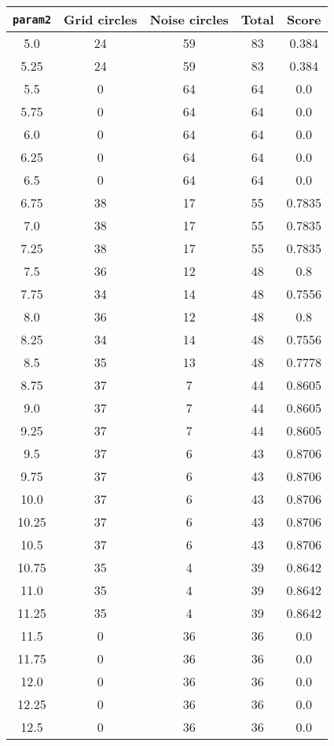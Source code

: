 \documentclass[letterpaper, 12pt]{article}
\begin{document}
\begin{longtable}{|c|c|c|c|c|}
\hline
\textbf{\texttt{param2}} & \textbf{Grid circles} & \textbf{Noise circles} & \textbf{Total} & \textbf{Score} \\
\hline
5.0 & 24 & 59 & 83 & 0.384 \\
\hline
5.25 & 24 & 59 & 83 & 0.384 \\
\hline
5.5 & 0 & 64 & 64 & 0.0 \\
\hline
5.75 & 0 & 64 & 64 & 0.0 \\
\hline
6.0 & 0 & 64 & 64 & 0.0 \\
\hline
6.25 & 0 & 64 & 64 & 0.0 \\
\hline
6.5 & 0 & 64 & 64 & 0.0 \\
\hline
6.75 & 38 & 17 & 55 & 0.7835 \\
\hline
7.0 & 38 & 17 & 55 & 0.7835 \\
\hline
7.25 & 38 & 17 & 55 & 0.7835 \\
\hline
7.5 & 36 & 12 & 48 & 0.8 \\
\hline
7.75 & 34 & 14 & 48 & 0.7556 \\
\hline
8.0 & 36 & 12 & 48 & 0.8 \\
\hline
8.25 & 34 & 14 & 48 & 0.7556 \\
\hline
8.5 & 35 & 13 & 48 & 0.7778 \\
\hline
8.75 & 37 & 7 & 44 & 0.8605 \\
\hline
9.0 & 37 & 7 & 44 & 0.8605 \\
\hline
9.25 & 37 & 7 & 44 & 0.8605 \\
\hline
9.5 & 37 & 6 & 43 & 0.8706 \\
\hline
9.75 & 37 & 6 & 43 & 0.8706 \\
\hline
10.0 & 37 & 6 & 43 & 0.8706 \\
\hline
10.25 & 37 & 6 & 43 & 0.8706 \\
\hline
10.5 & 37 & 6 & 43 & 0.8706 \\
\hline
10.75 & 35 & 4 & 39 & 0.8642 \\
\hline
11.0 & 35 & 4 & 39 & 0.8642 \\
\hline
11.25 & 35 & 4 & 39 & 0.8642 \\
\hline
11.5 & 0 & 36 & 36 & 0.0 \\
\hline
11.75 & 0 & 36 & 36 & 0.0 \\
\hline
12.0 & 0 & 36 & 36 & 0.0 \\
\hline
12.25 & 0 & 36 & 36 & 0.0 \\
\hline
12.5 & 0 & 36 & 36 & 0.0 \\

\end{longtable}
\end{document}
